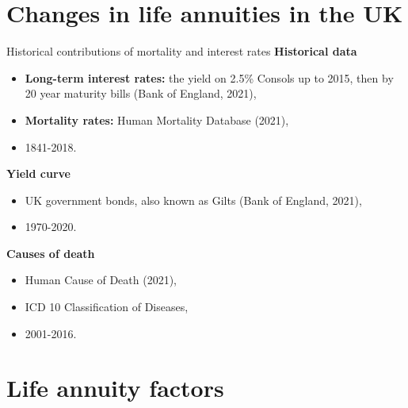 \documentclass[10pt]{beamer}
\begin{document}
\section{Changes in life annuities in the UK}


\begin{frame}{Historical contributions of mortality and interest rates}
\textbf{Historical data}
\begin{itemize}
	\item \textbf{Long-term interest rates:} the yield on 2.5\% Consols up to 2015, then by 20 year maturity bills (Bank of England, 2021), \pause
	\item \textbf{Mortality rates:} Human Mortality Database (2021), \pause
	\item 1841-2018. \pause
\end{itemize}

\textbf{Yield curve}
\begin{itemize}
	\item UK government bonds, also known as Gilts (Bank of England, 2021),
	\item 1970-2020. \pause

\end{itemize}

\textbf{Causes of death}
\begin{itemize}
	\item Human Cause of Death (2021), \pause
	\item ICD 10 Classification of Diseases, \pause
	\item 2001-2016.
\end{itemize}



\end{frame}



\section{Life annuity factors}
\end{document}
